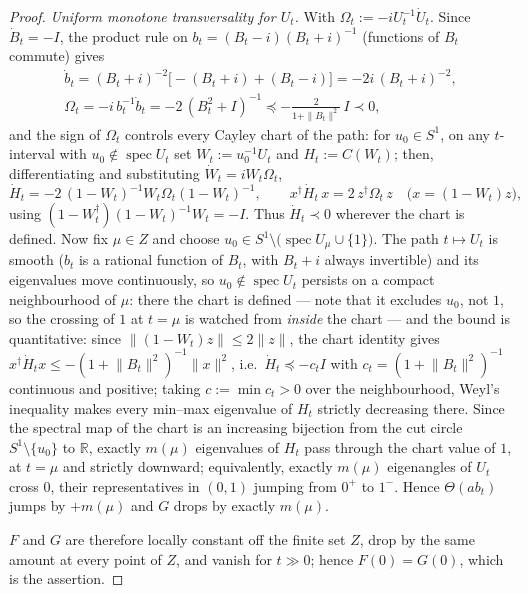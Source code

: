 \documentclass[11pt]{article}
\theoremstyle{definition}
\newcommand{\R}{\mathbb R}
\begin{document}
\begin{proof}
\emph{Uniform monotone transversality for $U_t$.} With
$\Omega_t:=-iU_t^{-1}\dot U_t$. Since $\dot B_t=-I$, the product rule
on $b_t=(B_t-i)(B_t+i)^{-1}$ (functions of $B_t$ commute) gives
\begin{gather*}
\dot b_t=(B_t+i)^{-2}\bigl[-(B_t+i)+(B_t-i)\bigr]=-2i\,(B_t+i)^{-2},\\
\Omega_t=-i\,b_t^{-1}\dot b_t=-2\,(B_t^{2}+I)^{-1}
\preceq-\frac{2}{1+\|B_t\|^{2}}\,I\prec0 ,
\end{gather*}
and the sign of $\Omega_t$ controls every Cayley chart of the path: for
$u_0\in S^{1}$, on any $t$-interval with
$u_0\notin\operatorname{spec}U_t$ set $W_t:=u_0^{-1}U_t$ and
$H_t:=C(W_t)$; then, differentiating and substituting
$\dot W_t=iW_t\Omega_t$,
\[
\dot H_t=-2\,(1-W_t)^{-1}W_t\Omega_t(1-W_t)^{-1},
\qquad
x^{\dagger}\dot H_t\,x=2\,z^{\dagger}\Omega_t\,z
\quad\bigl(x=(1-W_t)z\bigr),
\]
using $(1-W_t^{\dagger})(1-W_t)^{-1}W_t=-I$. Thus $\dot H_t\prec0$
wherever the chart is defined. Now fix $\mu\in Z$ and choose
$u_0\in S^{1}\setminus\bigl(\operatorname{spec}U_{\mu}\cup\{1\}\bigr)$.
The path $t\mapsto U_t$ is smooth ($b_t$ is a rational function of
$B_t$, with $B_t+i$ always invertible) and its eigenvalues move
continuously, so $u_0\notin\operatorname{spec}U_t$ persists on a
compact neighbourhood of $\mu$: there the chart is defined --- note
that it excludes $u_0$, not $1$, so the crossing of $1$ at $t=\mu$ is
watched from \emph{inside} the chart --- and the
bound is quantitative: since $\lVert(1-W_t)z\rVert\le2\lVert z\rVert$,
the chart identity gives
$x^{\dagger}\dot H_tx\le-(1+\lVert B_t\rVert^{2})^{-1}\lVert
x\rVert^{2}$, i.e.\ $\dot H_t\preceq-c_tI$ with
$c_t=(1+\lVert B_t\rVert^{2})^{-1}$ continuous and positive; taking
$c:=\min c_t>0$ over the neighbourhood, Weyl's inequality makes every
min--max eigenvalue of $H_t$ strictly decreasing there. Since the
spectral map of the chart is an increasing bijection from the cut
circle $S^{1}\setminus\{u_0\}$ to $\R$, exactly $m(\mu)$ eigenvalues
of $H_t$ pass through the chart value of $1$, at $t=\mu$ and strictly
downward; equivalently, exactly $m(\mu)$ eigenangles of $U_t$ cross
$0$, their representatives in $(0,1)$ jumping from $0^{+}$ to $1^{-}$.
Hence $\Theta(ab_t)$ jumps by $+m(\mu)$ and $G$ drops by exactly
$m(\mu)$.

$F$ and $G$ are therefore locally constant off the finite set $Z$,
drop by the same amount at every point of $Z$, and vanish for
$t\gg0$; hence $F(0)=G(0)$, which is the assertion.

\end{proof}
\end{document}
